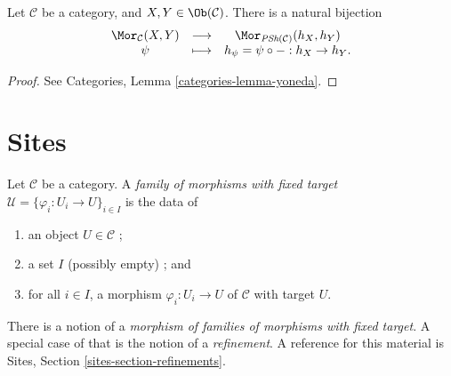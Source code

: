 \begin{lemma}[Yoneda]
\label{lemma-yoneda}
Let $\mathcal{C}$ be a category, and $X, Y \in
\Ob(\mathcal{C})$. There is a natural bijection
$$
\begin{matrix}
\Mor_\mathcal{C}(X, Y) &
\longrightarrow &
\Mor_{\textit{PSh}(\mathcal{C})} (h_X, h_Y) \\
\psi &
\longmapsto &
h_\psi = \psi \circ - : h_X \to h_Y.
\end{matrix}
$$
\end{lemma}

\begin{proof}
See
Categories, Lemma \ref{categories-lemma-yoneda}.
\end{proof}




\section{Sites}
\label{section-sites}


\begin{definition}
\label{definition-family-morphisms-fixed-target}
Let $\mathcal{C}$ be a category. A {\it family of morphisms with fixed target}
$\mathcal{U} = \{\varphi_i : U_i \to U\}_{i\in I}$ is the data of
\begin{enumerate}
\item an object $U \in \mathcal{C}$ ;
\item a set $I$ (possibly empty) ; and
\item for all $i\in I$, a morphism $\varphi_i : U_i \to U$ of $\mathcal{C}$
with target $U$.
\end{enumerate}
\end{definition}

\noindent
There is a notion of a {\it morphism of families of morphisms with fixed
target}. A special case of that is the notion of a {\it refinement}.
A reference for this material is
Sites, Section \ref{sites-section-refinements}.

